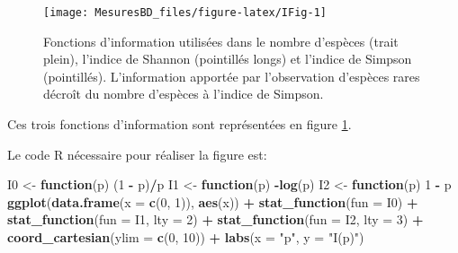 \documentclass[
  11pt,
  french,
  a4paper,
  extrafontsizes,onecolumn,openright
  ]{memoir}
\newenvironment{Shaded}{\begin{snugshade}}{\end{snugshade}}
\newcommand{\ControlFlowTok}[1]{\textcolor[rgb]{0.13,0.29,0.53}{\textbf{#1}}}
\newcommand{\DataTypeTok}[1]{\textcolor[rgb]{0.13,0.29,0.53}{#1}}
\newcommand{\DecValTok}[1]{\textcolor[rgb]{0.00,0.00,0.81}{#1}}
\newcommand{\KeywordTok}[1]{\textcolor[rgb]{0.13,0.29,0.53}{\textbf{#1}}}
\newcommand{\NormalTok}[1]{#1}
\newcommand{\OperatorTok}[1]{\textcolor[rgb]{0.81,0.36,0.00}{\textbf{#1}}}
\newcommand{\StringTok}[1]{\textcolor[rgb]{0.31,0.60,0.02}{#1}}
\begin{document}
\scriptsize

\begin{figure}

{\centering \texttt{[image: MesuresBD\_files/figure-latex/IFig-1]} 

}

\caption{Fonctions d'information utilisées dans le nombre d'espèces (trait plein), l'indice de Shannon (pointillés longs) et l'indice de Simpson (pointillés). L'information apportée par l'observation d'espèces rares décroît du nombre d'espèces à l'indice de Simpson.}\label{fig:IFig}
\end{figure}

\normalsize

Ces trois fonctions d'information sont représentées en figure \ref{fig:IFig}.

Le code R nécessaire pour réaliser la figure est:

\scriptsize

\begin{Shaded}
\begin{Highlighting}[]
\NormalTok{I0 <-}\StringTok{ }\ControlFlowTok{function}\NormalTok{(p) (}\DecValTok{1} \OperatorTok{-}\StringTok{ }\NormalTok{p)}\OperatorTok{/}\NormalTok{p}
\NormalTok{I1 <-}\StringTok{ }\ControlFlowTok{function}\NormalTok{(p) }\OperatorTok{-}\KeywordTok{log}\NormalTok{(p)}
\NormalTok{I2 <-}\StringTok{ }\ControlFlowTok{function}\NormalTok{(p) }\DecValTok{1} \OperatorTok{-}\StringTok{ }\NormalTok{p}
\KeywordTok{ggplot}\NormalTok{(}\KeywordTok{data.frame}\NormalTok{(}\DataTypeTok{x =} \KeywordTok{c}\NormalTok{(}\DecValTok{0}\NormalTok{, }\DecValTok{1}\NormalTok{)), }\KeywordTok{aes}\NormalTok{(x)) }\OperatorTok{+}\StringTok{ }\KeywordTok{stat_function}\NormalTok{(}\DataTypeTok{fun =}\NormalTok{ I0) }\OperatorTok{+}
\StringTok{    }\KeywordTok{stat_function}\NormalTok{(}\DataTypeTok{fun =}\NormalTok{ I1, }\DataTypeTok{lty =} \DecValTok{2}\NormalTok{) }\OperatorTok{+}\StringTok{ }\KeywordTok{stat_function}\NormalTok{(}\DataTypeTok{fun =}\NormalTok{ I2,}
    \DataTypeTok{lty =} \DecValTok{3}\NormalTok{) }\OperatorTok{+}\StringTok{ }\KeywordTok{coord_cartesian}\NormalTok{(}\DataTypeTok{ylim =} \KeywordTok{c}\NormalTok{(}\DecValTok{0}\NormalTok{, }\DecValTok{10}\NormalTok{)) }\OperatorTok{+}\StringTok{ }\KeywordTok{labs}\NormalTok{(}\DataTypeTok{x =} \StringTok{"p"}\NormalTok{,}
    \DataTypeTok{y =} \StringTok{"I(p)"}\NormalTok{)}
\end{Highlighting}
\end{Shaded}
\end{document}
